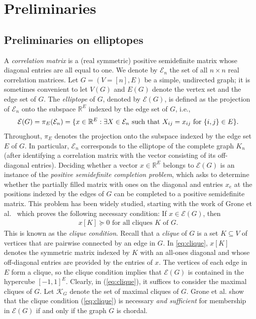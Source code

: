 \documentclass[a4paper, 11pt, twoside]{article}
\newcommand{\R}{\mathbb{R}}
\newcommand{\ME}{{\mathcal E}}
\newcommand{\MK}{{\mathcal K}}
\theoremstyle{plain}
\begin{document}
\section{Preliminaries} \label{sec:prelim}

\subsection{Preliminaries on elliptopes}\label{sec:prel-elliptope}

A \emph{correlation matrix} is a (real symmetric) positive semidefinite matrix whose diagonal entries are all equal to one. 
We denote by $\mathcal{E}_n$ the set of all $n \times n$ real correlation matrices.
Let $G=(V=[n],E)$ be a simple, undirected graph; it is sometimes convenient to let $V(G)$ and $E(G)$ denote   the vertex set and the edge set of $G$.
The  {\em elliptope} of $G$, denoted by $\mathcal{E}(G)$, is defined as the projection of $\mathcal{E}_n$ onto the subspace $\R^E$ indexed by the edge set of $G$, i.e.,
\[
\mathcal{E}(G) = \pi_E({\cal E}_n) = \{ x\in \R^E : \exists X\in \mathcal{E}_n \text{ such that } X_{ij}=x_{ij} \text{ for } \{i,j\}\in E\}.
\]
Throughout, $\pi_E$ denotes the projection onto the subspace indexed by the edge set $E$ of $G$. 
In particular, $\ME_n$ corresponds to the elliptope of the complete graph $K_n$ (after identifying a correlation matrix with the vector consisting of its off-diagonal entries). Deciding whether a vector $x\in\R^E$ belongs to $\ME(G)$ is an instance of the {\em positive semidefinite completion problem}, which asks to determine whether the partially filled matrix with ones on the diagonal and entries $x_e$ at the positions indexed by the edges of $G$ can be completed to a positive semidefinite matrix.
This problem has been widely studied, starting with the work of Grone et al.~\cite{GJSW_1984} which proves the following necessary condition: If  $x\in \ME(G)$, then 
\begin{align}\label{eq:clique}
x[K]\succeq 0 \text{ for all cliques } K \text{ of } G.
\end{align}
This is known as the {\em clique condition}. Recall that a {\em clique} of $G$ is a set $K\subseteq V$ of vertices that are pairwise connected by an edge in $G$. In \eqref{eq:clique}, $x[K]$ denotes the symmetric matrix indexed by $K$ with an all-ones diagonal and whose off-diagonal entries are provided by the entries of $x$. The vertices of each edge in $E$ form a clique, so the clique condition implies that $\ME(G)$ is contained in the hypercube  $[-1,1]^E$. Clearly, in (\ref{eq:clique}), it suffices to consider the maximal cliques of $G$. Let $\MK_G$ denote the set of maximal cliques of $G$.  
Grone et al.  \cite{GJSW_1984}  show that the clique condition (\ref{eq:clique}) is necessary \emph{and sufficient} for membership in $\ME(G)$ if and only if the graph $G$ is chordal. 
\end{document}

